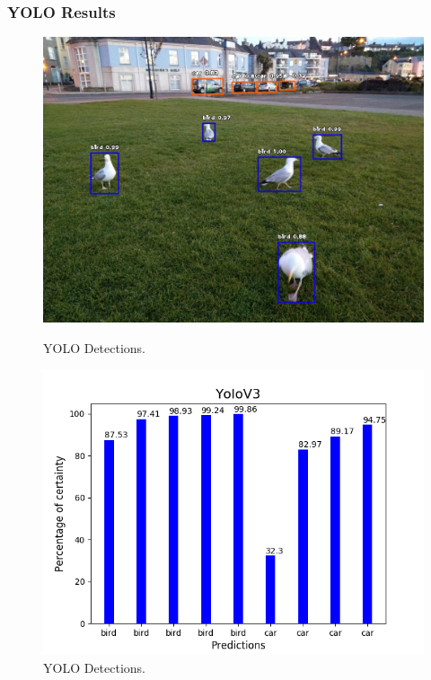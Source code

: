     \newpage

    \subsubsection{YOLO Results}
    
    \begin{figure}[htb]
        \centering
        \begin{minipage}[b]{0.44\textwidth}
          \includegraphics[width=\textwidth]{Sections/4InitialWork/4_images_obj_run3/yolo.jpg}
          \caption{YOLO Detections.}
        \end{minipage}
        \hfill
        \begin{minipage}[b]{0.50\textwidth}
          \includegraphics[width=\textwidth]{Sections/4InitialWork/4_images_obj_run3/yolo_graph.png}
          \caption{YOLO Detections.}
        \end{minipage}
      \end{figure}
    
